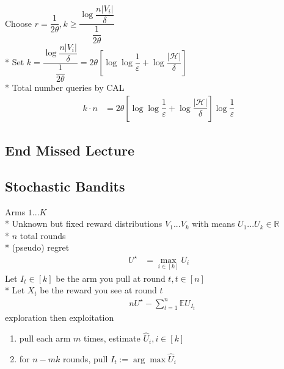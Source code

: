 \documentclass{article}
\begin{document}
\begin{figure}[H] \centering {} 
\end{figure}
Choose $r  = \dfrac{1}{2 \theta}, k \geq  \dfrac{\log \dfrac{n \left|  V_{i}  \right|}{\delta}}{\dfrac{1}{2 \theta}}$
\\* Set $k  = \dfrac{\log \dfrac{n \left|  V_{i}  \right|}{\delta}}{\dfrac{1}{2 \theta}} = 2 \theta \left[\log \log \dfrac{1}{\varepsilon} + \log \dfrac{\left|  \mathcal{H}  \right|}{\delta}\right]$
\\* Total number queries by CAL
\begin{align*}
k  \cdot  n &= 2 \theta \left[\log \log \dfrac{1}{\varepsilon} + \log \dfrac{\left|  \mathcal{H}  \right|}{\delta}\right] \log \dfrac{1}{\varepsilon}
\end{align*}


\subsection{End Missed Lecture}


\subsection{Stochastic Bandits}
Arms $1 ... K $
\\* Unknown but fixed reward distributions $V_{1} ... V_{k}$ with means $U_{1} ... U_{k} \in \mathbb{R}$
\\* $n $ total rounds
\\* (pseudo) regret
\begin{align*}
U^\star  &= \displaystyle\max_{i \in \left[k\right]} U_{i}
\end{align*}
Let $I_{t} \in \left[k\right]$ be the arm you pull at round $t , t \in \left[n\right]$
\\* Let $X_{t}$ be the reward you see at round $t $
\begin{align*}
&n  U^\star  - \displaystyle\sum_{t=1}^{n} \mathbb{E} U_{I_{t}}
\end{align*}
exploration then exploitation
\begin{enumerate}
\item pull each arm $m $ times, estimate $\hat{U}_{i}, i \in \left[k\right]$
\item for $n  - m  k $ rounds, pull $I_{t} := \arg\displaystyle\max \hat{U}_{i}$
\end{enumerate}
\end{document}
